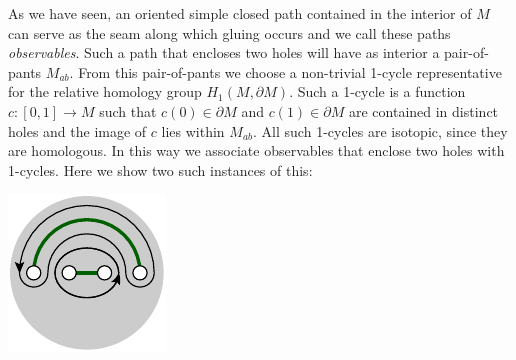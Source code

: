 \documentclass[aps, prl, letterpaper, twocolumn, superscriptaddress, notitlepage, 10pt]{revtex4-1}
\begin{document}
As we have seen, an oriented simple closed path 
contained in the interior of $M$ can serve as
the seam along which gluing occurs and we call
these paths \emph{observables}.
Such a path that encloses two holes
will have as interior a pair-of-pants $M_{ab}.$
From this pair-of-pants we choose 
a non-trivial 1-cycle representative 
for the
relative homology group $H_1(M, \partial M).$
Such a 1-cycle is 
a function $c:[0,1]\to M$ such that 
$c(0)\in \partial M$ and $c(1)\in \partial M$
are contained in distinct holes and the image of $c$
lies within $M_{ab}.$
All such 1-cycles are isotopic, since they are homologous.
In this way we associate observables that enclose two
holes with 1-cycles.
Here we show two such instances of this:
\begin{center}
\includegraphics[]{pic-2-curve.pdf}
\end{center}


\end{document}
